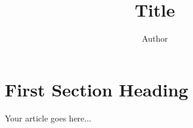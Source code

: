 \documentclass[12pt,a4,twoside]{article}
\title{Title}
\author{Author}
\date{}
\begin{document}
\maketitle

\section{First Section Heading}

Your article goes here...
\end{document}
